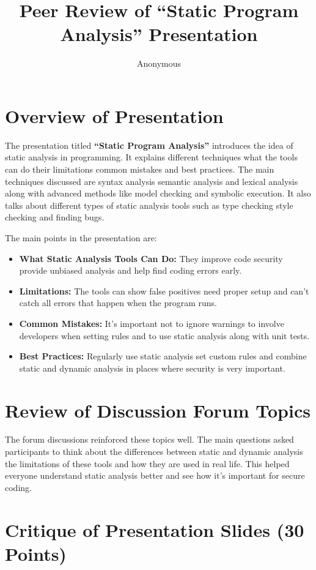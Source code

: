 \documentclass{article}
\title{Peer Review of “Static Program Analysis” Presentation}
\author{Anonymous}
\date{}
\begin{document}
\maketitle

\section*{Overview of Presentation}

The presentation titled \textbf{“Static Program Analysis”} introduces the idea of static analysis in programming. It explains different techniques what the tools can do their limitations common mistakes and best practices. The main techniques discussed are syntax analysis semantic analysis and lexical analysis along with advanced methods like model checking and symbolic execution. It also talks about different types of static analysis tools such as type checking style checking and finding bugs.

The main points in the presentation are:

\begin{itemize}
\item \textbf{What Static Analysis Tools Can Do:} They improve code security provide unbiased analysis and help find coding errors early.
\item \textbf{Limitations:} The tools can show false positives need proper setup and can’t catch all errors that happen when the program runs.
\item \textbf{Common Mistakes:} It’s important not to ignore warnings to involve developers when setting rules and to use static analysis along with unit tests.
\item \textbf{Best Practices:} Regularly use static analysis set custom rules and combine static and dynamic analysis in places where security is very important.
\end{itemize}

\section*{Review of Discussion Forum Topics}

The forum discussions reinforced these topics well. The main questions asked participants to think about the differences between static and dynamic analysis the limitations of these tools and how they are used in real life. This helped everyone understand static analysis better and see how it’s important for secure coding.

\section*{Critique of Presentation Slides (30 Points)}
\end{document}
